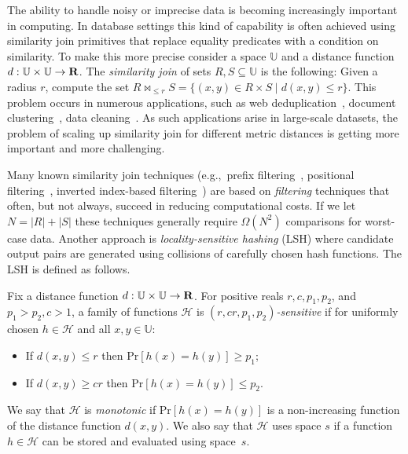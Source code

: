 \documentclass{llncs}
\renewcommand{\Pr}[1]{\text{Pr}\left[#1\right]}
\begin{document}
The ability to handle noisy or imprecise data is becoming increasingly important in computing.
In database settings this kind of capability is often achieved using similarity join primitives that replace equality predicates with a condition on similarity.
To make this more precise consider a space $\mathbb{U}$ and a distance function $d: \mathbb{U}\times \mathbb{U} \rightarrow {\bf R}$.
The {\em similarity join\/} of sets $R, S \subseteq \mathbb{U}$ is the following:
Given a radius $r$, compute the set 
$R \bowtie_{\leq r} S = \{ (x, y)\in R\times S \; | \; d(x, y	)\leq r \}.$
This problem occurs in numerous applications, such as web deduplication~\cite{Bayardo_WWW07,Henzinger_SIGIR06,Xiao_WWW08}, document clustering~\cite{Broder_NETWORK97}, data cleaning~\cite{Arasu_VLDB06,Chaudhuri_ICDE06}. 
As such applications arise in large-scale datasets, the problem of scaling up similarity join for different metric distances is getting more important and more challenging.


Many known similarity join techniques (e.g.,~prefix filtering~\cite{Arasu_VLDB06,Chaudhuri_ICDE06}, positional filtering~\cite{Xiao_WWW08}, inverted index-based filtering~\cite{Bayardo_WWW07}) are based on \emph{filtering} techniques that often, but not always, succeed in reducing computational costs.
If we let $N = |R|+|S|$ these techniques generally require $\Omega(N^2)$ comparisons for worst-case data.
Another  approach is \emph{locality-sensitive hashing} (LSH) where candidate output pairs are generated using collisions of carefully chosen hash functions. The LSH is defined as follows.
\begin{definition}\label{def:LSH}
Fix a distance function $d: \mathbb{U}\times \mathbb{U} \rightarrow {\bf R}$.
For positive reals $r,c,p_1,p_2$, and $p_1 > p_2, c > 1$, a family of functions $\mathcal{H}$ is \emph{$(r,cr,p_1,p_2)$-sensitive} if for uniformly chosen $h\in \mathcal{H}$ and all $x, y\in \mathbb{U}$:
\begin{itemize}
	\item If $d(x,y) \leq r$ then $\Pr{h(x)=h(y)}\geq p_1$;
	\item If $d(x,y) \geq cr$ then $\Pr{h(x)=h(y)}\leq p_2$.
\end{itemize}
We say that $\mathcal{H}$ is \textit{monotonic} if $\Pr{h(x)=h(y)}$ is a non-increasing function of the distance function $d(x,y)$.
We also say that $\mathcal{H}$ uses space $s$ if a function $h\in \mathcal{H}$ can be stored and evaluated using space~$s$.
\end{definition}
\end{document}
